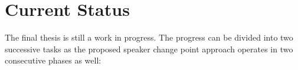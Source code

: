 \documentclass[FM,noheader,EN,bwtitles]{tulthesis}
\begin{document}


\chapter{Current Status}
\label{ch:currentStatus}

The final thesis is still a work in progress.
The progress can be divided into two successive tasks as the proposed speaker change point approach operates in two consecutive phases as well:

\end{document}
